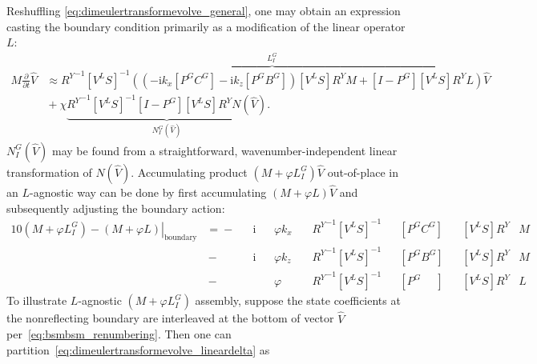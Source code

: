 \documentclass[letterpaper,11pt,nointlimits,reqno,draft]{amsbook}
\newcommand{\ii}{\ensuremath{\mathrm{i}}}
\begin{document}
Reshuffling \eqref{eq:dimeulertransformevolve_general}, one may obtain an
expression casting the boundary condition primarily as a modification of the
linear operator $L$:
\begin{align}
\label{eq:dimeulertransformevolve_linear}
  M \frac{\partial}{\partial{}t}
  \hat{V}
&\approx
\overbrace{
  {R^Y}^{-1}
  \left[V^L S\right]^{-1}
  \left(
    \left(- \ii k_x \left[P^G C^G\right] - \ii k_z \left[P^G B^G\right] \right)
    \left[V^L S\right] R^Y M
    +
    \left[I-P^G\right] \left[V^L S\right] R^Y
    L
  \right)
}^{L_I^G}
  \hat{V}
\\
&{}+
  \chi
\underbrace{
  {R^Y}^{-1}
  \left[V^L S\right]^{-1}
  \left[I - P^G\right] \left[V^L S\right] R^Y
  N(\hat{V})
}_{N_I^G\left(\hat{V}\right)}
.
\end{align}
$N_I^G(\hat{V})$ may be found from a straightforward, wavenumber-independent
linear transformation of $N(\hat{V})$. Accumulating product
$\left(M+\varphi{}L_I^G\right)\hat{V}$ out-of-place in an $L$-agnostic way can
be done by first accumulating $\left(M+\varphi{}L\right)\hat{V}$ and
subsequently adjusting the boundary action:
\begin{alignat}{10}
\label{eq:dimeulertransformevolve_lineardelta}
\left.\left(M+\varphi{}L_I^G\right) - \left(M+\varphi{}L\right)\right|_\text{boundary}
  &= {}-&&\ii &&\varphi{} k_x \, &&{R^Y}^{-1} \left[V^L S\right]^{-1} &&\left[P^G C^G\right] &&\left[V^L S\right] {R^Y} & M& \\
  &\,{}-&&\ii &&\varphi{} k_z    &&{R^Y}^{-1} \left[V^L S\right]^{-1} &&\left[P^G B^G\right] &&\left[V^L S\right] {R^Y} & M& \\
  &\,{}-&&    &&\varphi{}        &&{R^Y}^{-1} \left[V^L S\right]^{-1} &&\left[P^G \phantom{B^G}   \right] &&\left[V^L S\right] {R^Y} & L&
\end{alignat}
To illustrate $L$-agnostic $\left(M+\varphi{}L_I^G\right)$ assembly, suppose the
state coefficients at the nonreflecting boundary are interleaved at the bottom
of vector $\hat{V}$ per~\eqref{eq:bsmbsm_renumbering}. Then one can
partition~\eqref{eq:dimeulertransformevolve_lineardelta} as
\end{document}
